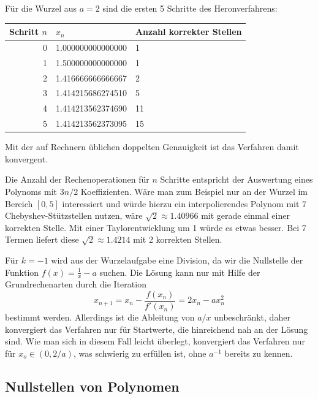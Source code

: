 Für die Wurzel aus $a=2$ sind die ersten 5 Schritte des Heronverfahrens:
\begin{center}
  \begin{tabular}{r|l|l}
    Schritt $n$ & $x_n$ & Anzahl korrekter Stellen \\\hline
    0 & 1.000000000000000 & 1 \\
    1 & 1.500000000000000 & 1 \\
    2 & 1.416666666666667 & 2 \\
    3 & 1.414215686274510 & 5 \\
    4 & 1.414213562374690 & 11 \\ 
    5 & 1.414213562373095 & 15
  \end{tabular}
\end{center}
Mit der auf Rechnern üblichen doppelten Genauigkeit ist das Verfahren
damit konvergent.

Die Anzahl der Rechenoperationen für $n$ Schritte entspricht der
Auswertung eines Polynoms mit $3n/2$ Koeffizienten. Wäre man zum
Beispiel nur an der Wurzel im Bereich $[0,5]$ interessiert und würde
hierzu ein interpolierendes Polynom mit 7 Chebyshev-Stützstellen
nutzen, wäre $\sqrt{2}\approx 1.40966$ mit gerade einmal einer
korrekten Stelle. Mit einer Taylorentwicklung um 1 würde es etwas
besser. Bei 7 Termen liefert diese $\sqrt{2}\approx 1.4214$ mit 2
korrekten Stellen.

Für $k=-1$ wird aus der Wurzelaufgabe eine Division, da wir die
Nullstelle der Funktion $f(x) = \frac{1}{x} - a$ suchen. Die Lösung
kann nur mit Hilfe der Grundrechenarten durch die Iteration
\begin{equation}
  x_{n+1} = x_n - \frac{f(x_n)}{f'(x_n)} = 2x_n - a x_n^2 
\end{equation}
bestimmt werden. Allerdings ist die Ableitung von $a/x$ unbeschränkt,
daher konvergiert das Verfahren nur für Startwerte, die hinreichend
nah an der Lösung sind. Wie man sich in diesem Fall leicht überlegt,
konvergiert das Verfahren nur für $x_o\in (0, 2/a)$, was schwierig zu
erfüllen ist, ohne $a^{-1}$ bereits zu kennen.

\subsection{Nullstellen von Polynomen}

